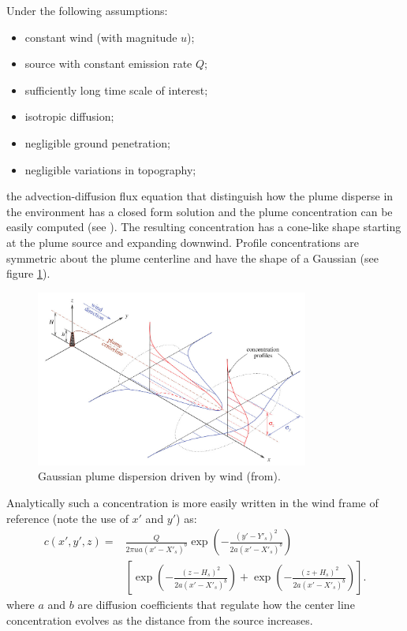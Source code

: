 \documentclass[a4paper,11pt]{report}
\begin{document}
Under the following assumptions:
\begin{itemize}
\item constant wind (with magnitude $u$);
\item source with constant emission rate $Q$;
\item sufficiently long time scale of interest;
\item isotropic diffusion;
\item negligible ground penetration; 
\item negligible variations in topography;
\end{itemize}
the advection-diffusion flux equation that distinguish how the plume disperse in the environment has a closed form solution and the plume concentration can be easily computed (see \cite{stockie2011}).
The resulting concentration has a cone-like shape starting at the plume source and expanding downwind. Profile concentrations are symmetric about the plume centerline and have the shape of a Gaussian (see figure \ref{fig:winddisp}).
\begin{figure}[b!]
\centering
\includegraphics[width=0.8\textwidth]{fig/plumedistr.jpg}
\caption{Gaussian plume dispersion driven by wind (from\cite{stockie2011}).\label{fig:winddisp}}
\end{figure}

Analytically such a concentration is more easily written in the wind frame of reference (note the use of $x'$ and $y'$) as:
\begin{align}\label{eqn:singlesourcegaussiandispersion}
c(x',y',z) = &\frac{Q}{2\pi u a (x'-X'_s)^b}  \exp \left(-\frac{(y'-Y'_s)^2}{2 a (x'-X'_s)^b}\right) \nonumber \\
  & \left[ \exp \left(-\frac{(z-H_s)^2}{2 a (x'-X'_s)^b}\right) + \exp \left(-\frac{(z+H_s)^2}{2 a (x'-X'_s)^b}\right)\right]. 
\end{align}
where $a$ and $b$ are diffusion coefficients that regulate how the center line concentration evolves as the distance from the source increases.
\end{document}
